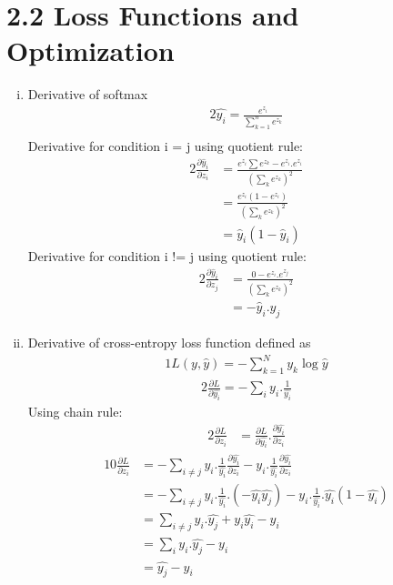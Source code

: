 \section*{2.2 Loss Functions and Optimization}
\begin{enumerate}[i)]
    \item Derivative of softmax
    \begin{alignat}{2}
        \hat{y_i}=\frac{e^{z_i}}{\sum_{k=1}^n e^{z_k}}
        \\
    \end{alignat}
    Derivative for condition i = j  using quotient rule:
    \begin{alignat}{2}
        \frac{\partial{\hat{y}_i}}{\partial{z}_i} &= \frac{e^{z_i}\sum e^{z_k} - e^{z_i} . e^{z_i}}{(\sum_k e^{z_k})^2}
        \\
        &= \frac{e^{z_i} (1 - e^{z_i})}{(\sum_k e^{z_k})^2}
        \\
        &= \hat y_i (1-\hat y_i)
    \end{alignat}
    Derivative for condition i != j  using quotient rule:
    \begin{alignat}{2}
        \frac{\partial{\hat{y}_i}}{\partial{z}_j} &= \frac{0- e^{z_i}.e^{z_j}}{(\sum_k e^{z_k})^2}
        \\
        &= -\hat{y}_i.\hat{y}_j
    \end{alignat}
    \item Derivative of cross-entropy loss function defined as
    \begin{alignat}{1}
        L(y, \hat{y}) = - \sum_{k=1}^N y_k \log\hat{y}
    \end{alignat}
    \begin{alignat}{2}
        \frac{\partial L}{\partial \hat{y_i}} = - \sum_i y_i . \frac{1}{\hat{y_i}}
    \end{alignat}
    Using chain rule:
    \begin{alignat}{2}
        \frac{\partial L}{\partial z_i} &= \frac{\partial L}{\partial \hat{y_i}} . \frac{\partial \hat{y_i}}{\partial z_i}
    \end{alignat}
    \begin{alignat}{10}
        \frac{\partial L}{\partial z_i} &= -  \sum_{i\not=j} y_i. \frac{1}{\hat{y_i}} \frac{\partial \hat{y_i}}{\partial z_i} - y_i.\frac{1}{\hat{y_i}}\frac{\partial \hat{y_i}}{\partial z_i}
        \\
        &= - \sum_{i\not=j} y_i.\frac{1}{\hat{y_i}} . (-\hat{y_i}\hat{y_j}) - y_i. \frac{1}{\hat{y_i}} . \hat{y_i} (1 - \hat{y_i})
        \\
        &= \sum_{i\not=j} y_i . \hat{y_j} + y_i \hat{y_i} - y_i
        \\
        &= \sum_i y_i . \hat{y_j} - y_i
        \\
        &= \hat{y_j} - y_i
    \end{alignat}
\end{enumerate}
\newpage
